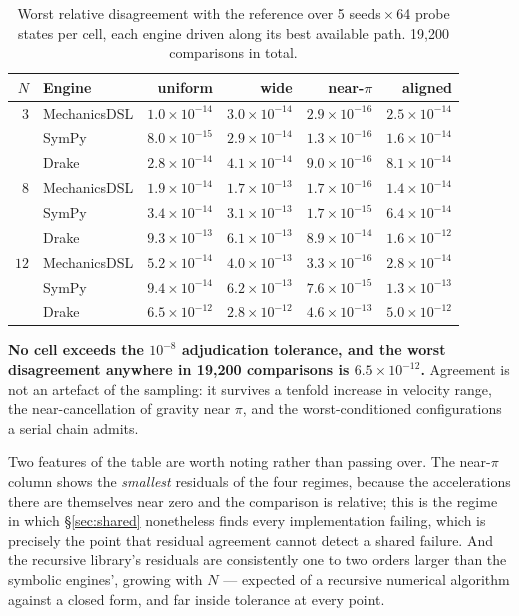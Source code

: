 \documentclass[review,12pt]{elsarticle}
\begin{document}
\begin{table}[!htbp]
\centering
\caption{Worst relative disagreement with the reference over 5 seeds\,$\times$\,64
probe states per cell, each engine driven along its best available path. 19{,}200
comparisons in total.}
\label{tab:probes}
\begin{tabular}{@{}rlrrrr@{}}
\toprule
$N$ & \textbf{Engine} & \textbf{uniform} & \textbf{wide} & \textbf{near-$\pi$} & \textbf{aligned} \\
\midrule
$3$  & MechanicsDSL & $1.0\times10^{-14}$ & $3.0\times10^{-14}$ & $2.9\times10^{-16}$ & $2.5\times10^{-14}$ \\
     & SymPy        & $8.0\times10^{-15}$ & $2.9\times10^{-14}$ & $1.3\times10^{-16}$ & $1.6\times10^{-14}$ \\
     & Drake        & $2.8\times10^{-14}$ & $4.1\times10^{-14}$ & $9.0\times10^{-16}$ & $8.1\times10^{-14}$ \\
\addlinespace
$8$  & MechanicsDSL & $1.9\times10^{-14}$ & $1.7\times10^{-13}$ & $1.7\times10^{-16}$ & $1.4\times10^{-14}$ \\
     & SymPy        & $3.4\times10^{-14}$ & $3.1\times10^{-13}$ & $1.7\times10^{-15}$ & $6.4\times10^{-14}$ \\
     & Drake        & $9.3\times10^{-13}$ & $6.1\times10^{-13}$ & $8.9\times10^{-14}$ & $1.6\times10^{-12}$ \\
\addlinespace
$12$ & MechanicsDSL & $5.2\times10^{-14}$ & $4.0\times10^{-13}$ & $3.3\times10^{-16}$ & $2.8\times10^{-14}$ \\
     & SymPy        & $9.4\times10^{-14}$ & $6.2\times10^{-13}$ & $7.6\times10^{-15}$ & $1.3\times10^{-13}$ \\
     & Drake        & $6.5\times10^{-12}$ & $2.8\times10^{-12}$ & $4.6\times10^{-13}$ & $5.0\times10^{-12}$ \\
\bottomrule
\end{tabular}
\end{table}

\noindent \textbf{No cell exceeds the $10^{-8}$ adjudication tolerance, and the worst
disagreement anywhere in 19{,}200 comparisons is $6.5\times10^{-12}$.} Agreement is
not an artefact of the sampling: it survives a tenfold increase in velocity
range, the near-cancellation of gravity near $\pi$, and the worst-conditioned
configurations a serial chain admits.

Two features of the table are worth noting rather than passing over. The
near-$\pi$ column shows the \emph{smallest} residuals of the four regimes, because the
accelerations there are themselves near zero and the comparison is relative;
this is the regime in which \S\ref{sec:shared} nonetheless finds every implementation
failing, which is precisely the point that residual agreement cannot detect a
shared failure. And the recursive library's residuals are consistently one to
two orders larger than the symbolic engines', growing with $N$ --- expected of a
recursive numerical algorithm against a closed form, and far inside tolerance at
every point.
\end{document}
